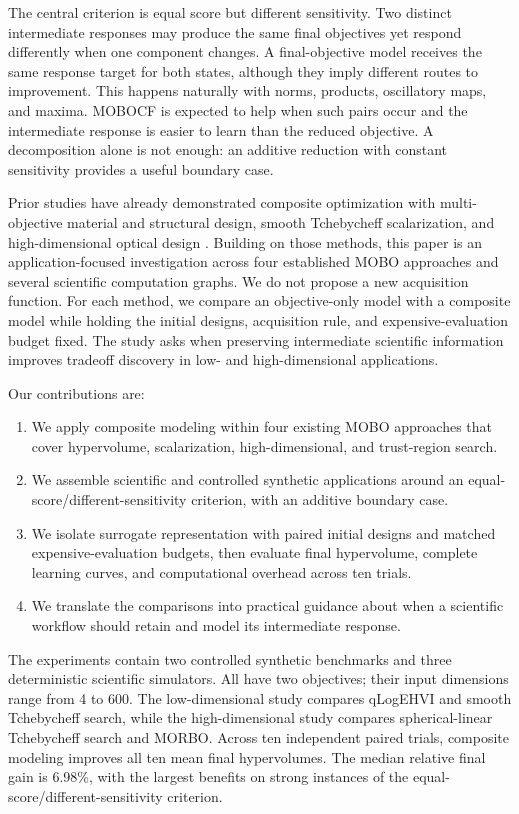 \documentclass{article}
\begin{document}
The central criterion is equal score but different sensitivity.  Two distinct
intermediate responses may produce the same final objectives yet respond
differently when one component changes.  A final-objective model receives the
same response target for both states, although they imply different routes to
improvement.  This happens naturally with norms, products, oscillatory maps,
and maxima.  MOBOCF is
expected to help when such pairs occur and the intermediate response is easier
to learn than the reduced objective.  A decomposition alone is not enough: an
additive reduction with constant sensitivity provides a useful boundary case.

Prior studies have already demonstrated composite optimization with
multi-objective material and structural design, smooth Tchebycheff
scalarization, and high-dimensional optical design
\cite{coelho2025composite,pires2026composite,maddox2021physics}.  Building on
those methods, this paper is an application-focused investigation across four
established MOBO approaches and several scientific computation graphs.  We do
not propose a new acquisition function.  For each method, we compare an
objective-only model with a composite model while holding the initial designs,
acquisition rule, and expensive-evaluation budget fixed.  The study asks when
preserving intermediate scientific information improves tradeoff discovery in
low- and high-dimensional applications.

Our contributions are:
\begin{enumerate}
    \item We apply composite modeling within four existing MOBO approaches that
    cover hypervolume, scalarization, high-dimensional, and trust-region search.
    \item We assemble scientific and controlled synthetic applications around
    an equal-score/different-sensitivity criterion, with an additive boundary
    case.
    \item We isolate surrogate representation with paired initial designs and
    matched expensive-evaluation budgets, then evaluate final hypervolume,
    complete learning curves, and computational overhead across ten trials.
    \item We translate the comparisons into practical guidance about when a
    scientific workflow should retain and model its intermediate response.
\end{enumerate}

The experiments contain two controlled synthetic benchmarks and three
deterministic scientific simulators.  All have two objectives; their input
dimensions range from 4 to 600.  The low-dimensional study compares qLogEHVI
and smooth Tchebycheff search, while the high-dimensional study compares
spherical-linear Tchebycheff search and MORBO.  Across ten independent paired
trials, composite modeling improves all ten mean final hypervolumes.  The median
relative final gain is 6.98\%, with the largest benefits on strong instances of
the equal-score/different-sensitivity criterion.
\end{document}
